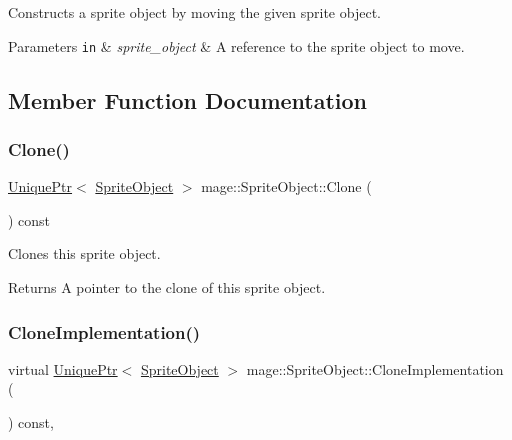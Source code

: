 Constructs a sprite object by moving the given sprite object.


\begin{DoxyParams}[1]{Parameters}
\mbox{\tt in}  & {\em sprite\+\_\+object} & A reference to the sprite object to move. \\
\hline
\end{DoxyParams}


\subsection{Member Function Documentation}
\hypertarget{classmage_1_1_sprite_object_a761528ee815cbac83f9a490e07752e5c}{}\label{classmage_1_1_sprite_object_a761528ee815cbac83f9a490e07752e5c} 
\subsubsection{\texorpdfstring{Clone()}{Clone()}}
{\footnotesize\ttfamily \hyperlink{namespacemage_a8c307fbcc33bce9b7f2aa4c26c3b95cf}{Unique\+Ptr}$<$ \hyperlink{classmage_1_1_sprite_object}{Sprite\+Object} $>$ mage\+::\+Sprite\+Object\+::\+Clone (\begin{DoxyParamCaption}{ }\end{DoxyParamCaption}) const}

Clones this sprite object.

\begin{DoxyReturn}{Returns}
A pointer to the clone of this sprite object. 
\end{DoxyReturn}
\hypertarget{classmage_1_1_sprite_object_acbbe3d5894e5a43df411b7e5785ae174}{}\label{classmage_1_1_sprite_object_acbbe3d5894e5a43df411b7e5785ae174} 
\subsubsection{\texorpdfstring{Clone\+Implementation()}{CloneImplementation()}}
{\footnotesize\ttfamily virtual \hyperlink{namespacemage_a8c307fbcc33bce9b7f2aa4c26c3b95cf}{Unique\+Ptr}$<$ \hyperlink{classmage_1_1_sprite_object}{Sprite\+Object} $>$ mage\+::\+Sprite\+Object\+::\+Clone\+Implementation (\begin{DoxyParamCaption}{ }\end{DoxyParamCaption}) const\hspace{0.3cm}{\ttfamily [private]}, {}}

